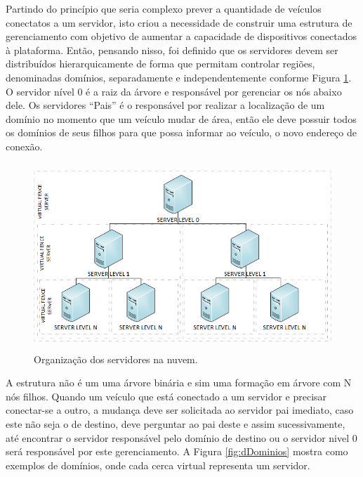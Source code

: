 \documentclass[
	12pt,				%
	oneside,			%
	a4paper,			%
	english,			%
	brazil				%
	]{abntex2ppgsi}
\begin{document}
Partindo do princípio que seria complexo prever a quantidade de veículos conectatos a um servidor, isto criou a necessidade de construir uma estrutura de gerenciamento com objetivo de aumentar a capacidade de dispositivos conectados à plataforma. Então, pensando nisso, foi definido que os servidores devem ser distribuídos hierarquicamente de forma que permitam controlar regiões, denominadas domínios, separadamente e independentemente conforme Figura \ref{fig:dServidores}. O servidor nível 0 é a raiz da árvore e responsável por gerenciar os nós abaixo dele. Os servidores ``Pais'' é o responsável por realizar a localização de um domínio no momento que um veículo mudar de área, então ele deve possuir todos os domínios de seus filhos para que possa informar ao veículo, o novo endereço de conexão. 


\begin{figure}[h!]
	\centering
	\includegraphics [width=12cm,height=7cm] {images/servidores.png}
	\caption{Organização dos servidores na nuvem.}
	\label{fig:dServidores}
\end{figure}

A estrutura não é um uma árvore binária e sim uma formação em árvore com N nós filhos. Quando um veículo que está conectado a um servidor e precisar conectar-se a outro, a mudança deve ser solicitada ao servidor pai imediato, caso este não seja o de destino, deve perguntar ao pai deste e assim sucessivamente, até encontrar o servidor responsável pelo domínio de destino ou o servidor nivel 0 será responsável por este gerenciamento. A Figura \ref{fig:dDominios} mostra como exemplos de domínios, onde cada cerca virtual representa um servidor.
\end{document}
